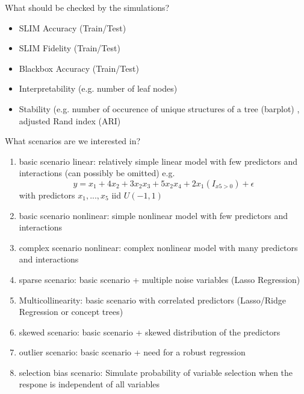 What should be checked by the simulations?
\begin{itemize}
    \item SLIM Accuracy (Train/Test)
    \item SLIM Fidelity (Train/Test)
    \item Blackbox Accuracy (Train/Test)
    \item Interpretability (e.g. number of leaf nodes)
    \item Stability (e.g. number of occurence of unique structures of a tree (barplot) \citep{Zhou.2018}, adjusted Rand index (ARI) \citep{Schlosser.24.06.2019}
\end{itemize}


What scenarios are we interested in?
\begin{enumerate}
    \item basic scenario linear: relatively simple linear model with few predictors and interactions (can possibly be omitted)
    e.g. $$y = x_{1} + 4x_{2} + 3 x_{2}x_{3} + 5x_{2}x_{4} + 2x_{1}(I_{x5>0}) + \epsilon$$
    with predictors $x_{1},...,x_{5}$ iid $U(-1,1)$
    \item basic scenario nonlinear: simple nonlinear model with few predictors and interactions 
    \item complex scenario nonlinear:  complex nonlinear model with many predictors and interactions 
    \item sparse scenario: basic scenario + multiple noise variables (Lasso Regression)
    \item Multicollinearity: basic scenario with correlated predictors (Lasso/Ridge Regression or concept trees)
    \item skewed scenario: basic scenario + skewed distribution of the predictors
    \item outlier scenario: basic scenario + need for a robust regression
    \item selection bias scenario: Simulate probability of variable selection when the respone is independent of all variables \citep{Hothorn.2006}
\end{enumerate}
